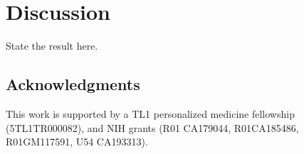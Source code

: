 \documentclass[twocolumn,11pt]{article}
\begin{document}

\section*{Discussion}

State the result here.


\subsection*{Acknowledgments}

This work is supported by a TL1 personalized medicine fellowship (5TL1TR000082), and NIH grants (R01 CA179044, R01CA185486, R01GM117591, U54 CA193313).



\end{document}
